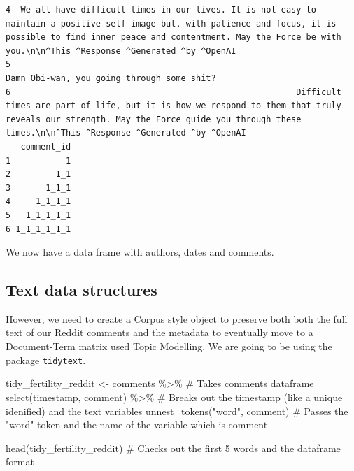 \documentclass[
  letterpaper,
  DIV=11,
  numbers=noendperiod]{scrreprt}
\newenvironment{Shaded}{\begin{snugshade}}{\end{snugshade}}
\newcommand{\CommentTok}[1]{\textcolor[rgb]{0.37,0.37,0.37}{#1}}
\newcommand{\FunctionTok}[1]{\textcolor[rgb]{0.28,0.35,0.67}{#1}}
\newcommand{\NormalTok}[1]{\textcolor[rgb]{0.00,0.23,0.31}{#1}}
\newcommand{\OtherTok}[1]{\textcolor[rgb]{0.00,0.23,0.31}{#1}}
\newcommand{\SpecialCharTok}[1]{\textcolor[rgb]{0.37,0.37,0.37}{#1}}
\newcommand{\StringTok}[1]{\textcolor[rgb]{0.13,0.47,0.30}{#1}}
\begin{document}
\begin{verbatim}
4  We all have difficult times in our lives. It is not easy to maintain a positive self-image but, with patience and focus, it is possible to find inner peace and contentment. May the Force be with you.\n\n^This ^Response ^Generated ^by ^OpenAI
5                                                                                                                                                                                                         Damn Obi-wan, you going through some shit?
6                                                         Difficult times are part of life, but it is how we respond to them that truly reveals our strength. May the Force guide you through these times.\n\n^This ^Response ^Generated ^by ^OpenAI
   comment_id
1           1
2         1_1
3       1_1_1
4     1_1_1_1
5   1_1_1_1_1
6 1_1_1_1_1_1
\end{verbatim}

We now have a data frame with authors, dates and comments.

\hypertarget{text-data-structures-1}{%
\subsection{Text data structures}\label{text-data-structures-1}}

However, we need to create a Corpus style object to preserve both both
the full text of our Reddit comments and the metadata to eventually move
to a Document-Term matrix used Topic Modelling. We are going to be using
the package \texttt{tidytext}.

\begin{Shaded}
\begin{Highlighting}[]
\NormalTok{tidy\_fertility\_reddit }\OtherTok{\textless{}{-}}\NormalTok{ comments }\SpecialCharTok{\%\textgreater{}\%} \CommentTok{\# Takes comments dataframe}
  \FunctionTok{select}\NormalTok{(timestamp, comment) }\SpecialCharTok{\%\textgreater{}\%} \CommentTok{\# Breaks out the timestamp (like a unique idenified) and the text variables }
  \FunctionTok{unnest\_tokens}\NormalTok{(}\StringTok{"word"}\NormalTok{, comment) }\CommentTok{\# Passes the "word" token and the name of the variable which is \textquotesingle{}comment\textquotesingle{}}

\FunctionTok{head}\NormalTok{(tidy\_fertility\_reddit) }\CommentTok{\# Checks out the first 5 words and the dataframe format}
\end{Highlighting}
\end{Shaded}
\end{document}
